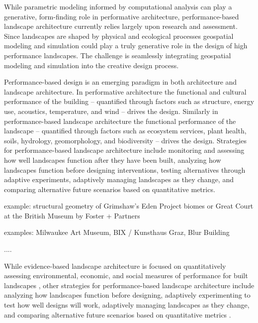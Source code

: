 

While parametric modeling informed by computational analysis 
can play a generative, form-finding role 
in performative architecture, 
performance-based landscape architecture 
currently relies largely upon research and assessment.
Since landscapes are shaped by physical and ecological processes
geospatial modeling and simulation could play a truly generative role 
in the design of high performance landscapes.
%
The challenge is seamlessly integrating 
geospatial modeling and simulation
into the creative design process.



Performance-based design is an emerging paradigm 
in both architecture and landscape architecture. 
In performative architecture 
the functional and cultural performance of the building 
-- quantified through factors such as
structure, energy use, acoustics, temperature, and wind --
drives the design.
\cite{Kolarevic2005}
Similarly in performance-based landscape architecture 
the functional performance of the landscape
-- quantified through factors such as
ecosystem services, plant health, soils, 
hydrology, geomorphology, and biodiversity -- 
drives the design. 
Strategies for performance-based landscape architecture include
monitoring and assessing how well landscapes function
after they have been built, \cite{Yang2016}
analyzing how landscapes function before designing interventions,
testing alternatives through adaptive experiments,
adaptively managing landscapes as they change, 
and comparing alternative future scenarios 
based on quantitative metrics. \cite{Lovell2015}

example: structural geometry of Grimshaw's Eden Project biomes
or Great Court at the British Museum by Foster + Partners

examples: Milwaukee Art Museum, BIX / Kunsthaus Graz, Blur Building


....

While evidence-based landscape architecture
is focused on quantitatively assessing 
environmental, economic, and social 
measures of performance
for built landscapes
\cite{Yang2016}, 
other strategies
for performance-based landscape architecture include
analyzing how landscapes function before designing,
adaptively experimenting to test how well designs will work,
adaptively managing landscapes as they change, 
and comparing alternative future scenarios based on quantitative metrics
\cite{Lovell2015}. 

